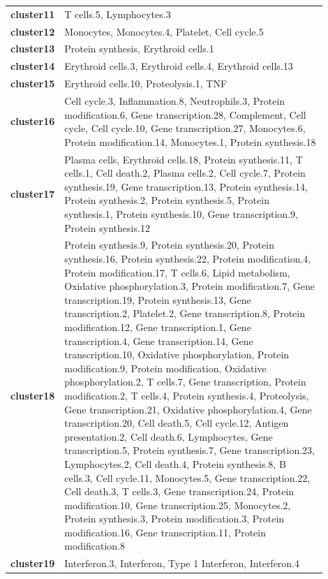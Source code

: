 \documentclass[12pt,a4paper]{report}
\begin{document}
\begin{longtable}{l p{0.9\linewidth} }
\addlinespace
\textbf{cluster11} & T cells.5, Lymphocytes.3 \\
\addlinespace
\textbf{cluster12} & Monocytes, Monocytes.4, Platelet, Cell cycle.5 \\
\addlinespace
\textbf{cluster13} & Protein synthesis, Erythroid cells.1 \\
\addlinespace
\textbf{cluster14} & Erythroid cells.3, Erythroid cells.4, Erythroid cells.13 \\
\addlinespace
\textbf{cluster15} & Erythroid cells.10, Proteolysis.1, TNF \\
\addlinespace
\textbf{cluster16} & Cell cycle.3, Inflammation.8, Neutrophils.3, Protein modification.6, Gene transcription.28, Complement, Cell cycle, Cell cycle.10, Gene transcription.27, Monocytes.6, Protein modification.14, Monocytes.1, Protein synthesis.18 \\
\addlinespace
\textbf{cluster17} & Plasma cells, Erythroid cells.18, Protein synthesis.11, T cells.1, Cell death.2, Plasma cells.2, Cell cycle.7, Protein synthesis.19, Gene transcription.13, Protein synthesis.14, Protein synthesis.2, Protein synthesis.5, Protein synthesis.1, Protein synthesis.10, Gene transcription.9, Protein synthesis.12 \\
\addlinespace
\textbf{cluster18} & Protein synthesis.9, Protein synthesis.20, Protein synthesis.16, Protein synthesis.22, Protein modification.4, Protein modification.17, T cells.6, Lipid metabolism, Oxidative phosphorylation.3, Protein modification.7, Gene transcription.19, Protein synthesis.13, Gene transcription.2, Platelet.2, Gene transcription.8, Protein modification.12, Gene transcription.1, Gene transcription.4, Gene transcription.14, Gene transcription.10, Oxidative phosphorylation, Protein modification.9, Protein modification, Oxidative phosphorylation.2, T cells.7, Gene transcription, Protein modification.2, T cells.4, Protein synthesis.4, Proteolysis, Gene transcription.21, Oxidative phosphorylation.4, Gene transcription.20, Cell death.5, Cell cycle.12, Antigen presentation.2, Cell death.6, Lymphocytes, Gene transcription.5, Protein synthesis.7, Gene transcription.23, Lymphocytes.2, Cell death.4, Protein synthesis.8, B cells.3, Cell cycle.11, Monocytes.5, Gene transcription.22, Cell death.3, T cells.3, Gene transcription.24, Protein modification.10, Gene transcription.25, Monocytes.2, Protein synthesis.3, Protein modification.3, Protein modification.16, Gene transcription.11, Protein modification.8 \\
\addlinespace
\textbf{cluster19} & Interferon.3, Interferon, Type 1 Interferon, Interferon.4 \\

\end{longtable}
\end{document}
